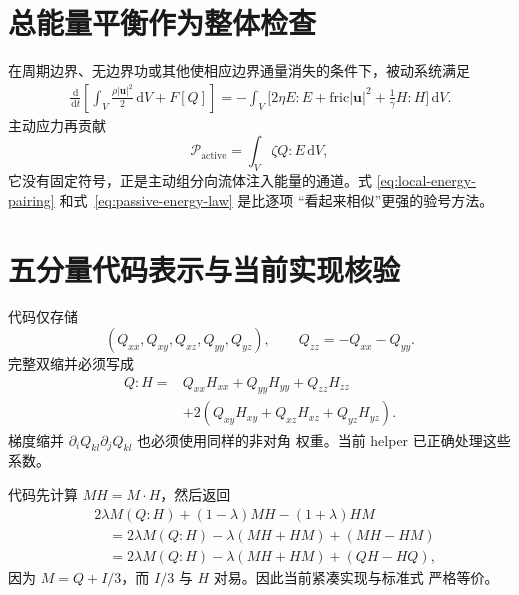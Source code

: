 \documentclass[UTF8,11pt,a4paper]{ctexart}
\newcommand{\dd}{\,\mathrm d}
\begin{document}
\section{总能量平衡作为整体检查}

在周期边界、无边界功或其他使相应边界通量消失的条件下，被动系统满足
\begin{equation}
\begin{aligned}
\frac{\dd}{\dd t}
\left[
\int_V\frac{\rho|\bm u|^2}{2}\dd V+F[Q]
\right]
=-\int_V\bigg[
2\eta E:E+\mathrm{fric}|\bm u|^2
+\frac{1}{\gamma}H:H
\bigg]\dd V.
\end{aligned}
\label{eq:passive-energy-law}
\end{equation}
主动应力再贡献
\begin{equation}
  \mathcal P_{\mathrm{active}}
  =\int_V\zeta Q:E\dd V,
\end{equation}
它没有固定符号，正是主动组分向流体注入能量的通道。式
\eqref{eq:local-energy-pairing} 和式~\eqref{eq:passive-energy-law} 是比逐项
“看起来相似”更强的验号方法。

\section{五分量代码表示与当前实现核验}

代码仅存储
\begin{equation}
  (Q_{xx},Q_{xy},Q_{xz},Q_{yy},Q_{yz}),
  \qquad Q_{zz}=-Q_{xx}-Q_{yy}.
\end{equation}
完整双缩并必须写成
\begin{equation}
\begin{aligned}
Q:H={}&Q_{xx}H_{xx}+Q_{yy}H_{yy}+Q_{zz}H_{zz}\\
&+2(Q_{xy}H_{xy}+Q_{xz}H_{xz}+Q_{yz}H_{yz}).
\end{aligned}
\end{equation}
梯度缩并 $\partial_iQ_{kl}\partial_jQ_{kl}$ 也必须使用同样的非对角
权重。当前 helper 已正确处理这些系数。

代码先计算 $MH=M\cdot H$，然后返回
\begin{equation}
\begin{aligned}
&2\lambda M(Q:H)+(1-\lambda)MH-(1+\lambda)HM\\
&\quad=2\lambda M(Q:H)-\lambda(MH+HM)+(MH-HM)\\
&\quad=2\lambda M(Q:H)-\lambda(MH+HM)+(QH-HQ),
\end{aligned}
\end{equation}
因为 $M=Q+I/3$，而 $I/3$ 与 $H$ 对易。因此当前紧凑实现与标准式
严格等价。
\end{document}
